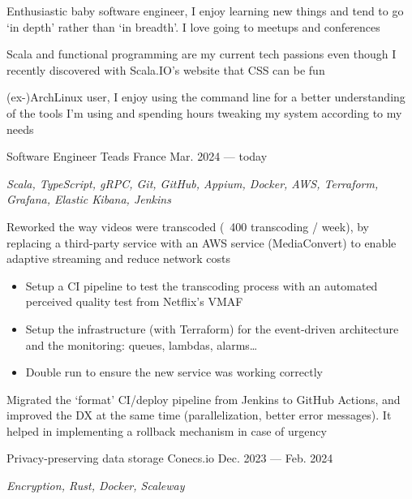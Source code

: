 \begin{MainPart}
  \color{Black}
  \vspace{0.25cm}
  {
    \vspace{-\baselineskip}
    \begin{flushleft}
      Enthusiastic baby software engineer, I enjoy learning new things and tend to go `in depth' rather than `in breadth'. I love going to meetups and conferences

      \vspace{0.5\baselineskip}
      Scala and functional programming are my current tech passions even though I recently discovered with Scala.IO's website that CSS can be fun

      \vspace{0.5\baselineskip}
      (ex-)ArchLinux user, I enjoy using the command line for a better understanding of the tools I'm using and spending hours tweaking my system according to my needs
    \end{flushleft}
  }

  \Experience%
  {Software Engineer}
  {Teads France}
  {Mar. 2024 --- today}
  {
    \textit{Scala, TypeScript, gRPC, Git, GitHub, Appium, Docker, AWS, Terraform, Grafana, Elastic Kibana, Jenkins}

    \begin{ItemList}{\ColorHighlight}
      \item[\ding{226}] Reworked the way videos were transcoded (~400 transcoding / week), by replacing a third-party service with an AWS service (MediaConvert) to enable adaptive streaming and reduce network costs
      \begin{itemize}
        \item Setup a CI pipeline to test the transcoding process with an automated perceived quality test from Netflix's VMAF
        \item Setup the infrastructure (with Terraform) for the event-driven architecture and the monitoring: queues, lambdas, alarms\dots
        \item Double run to ensure the new service was working correctly
      \end{itemize}
      \item[\ding{226}] Migrated the `format' CI/deploy pipeline from Jenkins to GitHub Actions, and improved the DX at the same time (parallelization, better error messages). It helped in implementing a rollback mechanism in case of urgency
    \end{ItemList}
  }
  \Experience%
  {Privacy-preserving data storage}
  {Conecs.io}
  {Dec. 2023 --- Feb. 2024}
  {
    \textit{Encryption, Rust, Docker, Scaleway}

}
\end{MainPart}
